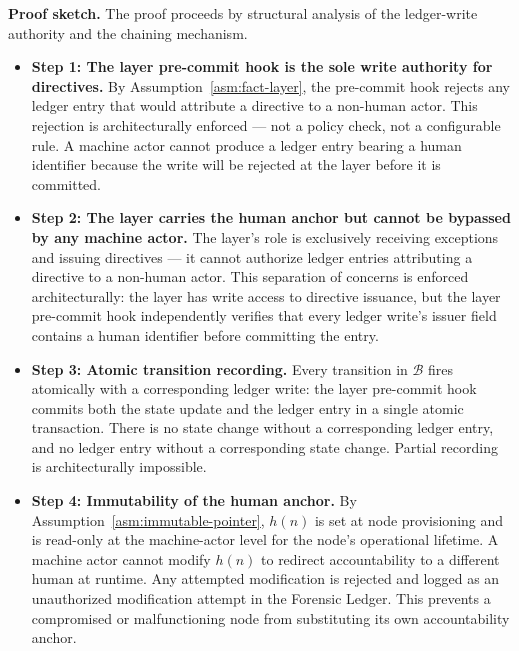 \medskip
\noindent\textbf{Proof sketch.} The proof proceeds by structural analysis of the
ledger-write authority and the chaining mechanism.

\begin{itemize}
  \setlength\itemsep{0pt}
  \item[$\bullet$] \textbf{Step 1: The \fact{} layer pre-commit hook is the sole
    write authority for directives.}
    By Assumption~\ref{asm:fact-layer}, the pre-commit hook rejects any ledger entry
    that would attribute a directive to a non-human actor. This rejection is
    architecturally enforced — not a policy check, not a configurable rule. A machine
    actor cannot produce a ledger entry bearing a human identifier because the write
    will be rejected at the \fact{} layer before it is committed.

  \item[$\bullet$] \textbf{Step 2: The \purpose{} layer carries the human anchor but
    cannot be bypassed by any machine actor.}
    The \purpose{} layer's role is exclusively receiving exceptions and issuing
    directives — it cannot authorize ledger entries attributing a directive to a
    non-human actor. This separation of concerns is enforced architecturally: the
    \purpose{} layer has write access to directive issuance, but the \fact{} layer
    pre-commit hook independently verifies that every ledger write's issuer field
    contains a human identifier before committing the entry.

  \item[$\bullet$] \textbf{Step 3: Atomic transition recording.}
    Every transition in $\mathcal{B}$ fires atomically with a corresponding ledger
    write: the \fact{} layer pre-commit hook commits both the state update and the
    ledger entry in a single atomic transaction. There is no state change without a
    corresponding ledger entry, and no ledger entry without a corresponding state
    change. Partial recording is architecturally impossible.

  \item[$\bullet$] \textbf{Step 4: Immutability of the human anchor.}
    By Assumption~\ref{asm:immutable-pointer}, $h(n)$ is set at node provisioning and is
    read-only at the machine-actor level for the node's operational lifetime. A machine
    actor cannot modify $h(n)$ to redirect accountability to a different human at
    runtime. Any attempted modification is rejected and logged as an unauthorized
    modification attempt in the Forensic Ledger. This prevents a compromised or
    malfunctioning node from substituting its own accountability anchor.


\end{itemize}

